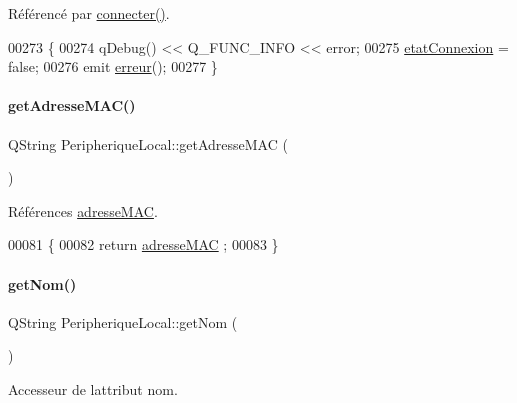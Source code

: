 Référencé par \hyperlink{class_peripherique_local_af2e7f023f8ed72ebc1d36e66c440ceca}{connecter()}.


\begin{DoxyCode}
00273 \{
00274     qDebug() << Q\_FUNC\_INFO << error;
00275     \hyperlink{class_peripherique_local_a5359e5a94b32b8a90c06ec999de13d2c}{etatConnexion} = \textcolor{keyword}{false};
00276     emit \hyperlink{class_peripherique_local_a41d9e18f2fd7e8e872db5fd3f21b11ff}{erreur}();
00277 \}
\end{DoxyCode}
\mbox{\label{class_peripherique_local_a79ce44141050f589d17f119a3b17444c}} 
\paragraph{\texorpdfstring{get\+Adresse\+M\+A\+C()}{getAdresseMAC()}}
{\footnotesize\ttfamily Q\+String Peripherique\+Local\+::get\+Adresse\+M\+AC (\begin{DoxyParamCaption}{ }\end{DoxyParamCaption})}



Références \hyperlink{class_peripherique_local_a76ccdcef703e7aff1f6f66dc615feba7}{adresse\+M\+AC}.


\begin{DoxyCode}
00081 \{
00082     \textcolor{keywordflow}{return} \hyperlink{class_peripherique_local_a76ccdcef703e7aff1f6f66dc615feba7}{adresseMAC} ;
00083 \}
\end{DoxyCode}
\mbox{\label{class_peripherique_local_af105d458828fbb17e5b556e23d7d7b42}} 
\paragraph{\texorpdfstring{get\+Nom()}{getNom()}}
{\footnotesize\ttfamily Q\+String Peripherique\+Local\+::get\+Nom (\begin{DoxyParamCaption}{ }\end{DoxyParamCaption})}

Accesseur de l\textquotesingle{}attribut nom.

